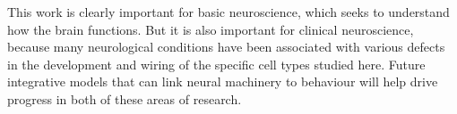 This work is clearly important for basic neuroscience, which seeks to
understand how the brain functions.  But it is also important for
clinical neuroscience, because many neurological conditions have been
associated with various defects in the development and wiring of the
specific cell types studied here.  Future integrative models that can
link neural machinery to behaviour will help drive progress in both of
these areas of research.
\endgroup
